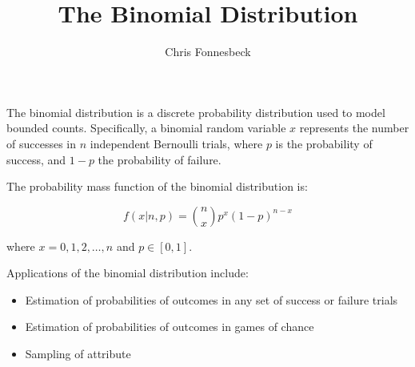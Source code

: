 \documentclass[11pt]{article}
\title{The Binomial Distribution}
\author{Chris Fonnesbeck}
\begin{document}
\maketitle %

The binomial distribution is a discrete probability distribution used to
model bounded counts. Specifically, a binomial random variable $x$ represents
the number of successes in $n$ independent Bernoulli trials, where $p$ is
the probability of success, and $1-p$ the probability of failure.


The probability mass function of the binomial distribution is:

\begin{equation}
    f(x | n,p) = {n \choose x} p^x (1-p)^{n-x} %
\end{equation}

\noindent where $x = 0,1,2,\ldots,n$ and $p \in [0,1]$.

Applications of the binomial distribution include:

\begin{itemize} %
    \item Estimation of probabilities of outcomes in any set of success or failure trials
    \item Estimation of probabilities of outcomes in games of chance
    \item Sampling of attribute
\end{itemize}
\end{document}
